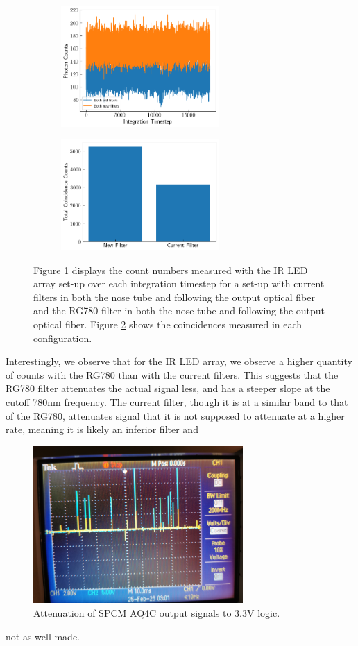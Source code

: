 \documentclass[letterpaper, 11 pt]{article}
\begin{document}
\begin{figure}[H]%
    \centering
    \begin{subfigure}{.4\textwidth}
    \includegraphics[width=6cm]{filter_ch1_IRled.png}
    \caption{ }
    \label{fig:irch1}
    \end{subfigure}
    \begin{subfigure}{.4\textwidth}
    \includegraphics[width = 6cm]{filter_cc_irled.png}
    \caption{ }
    \label{fig:ircc}
    \end{subfigure}
    \caption{Figure \ref{fig:irch1} displays the count numbers measured with the IR LED array set-up over each
    integration timestep for a set-up with current filters in both the
    nose tube and following the output optical fiber and the RG780 filter in
    both the nose tube and following the output optical fiber. Figure
    \ref{fig:ircc} shows the coincidences measured in each configuration.}
    \label{fig:ir_comp}
\end{figure}

Interestingly, we observe that for the IR LED array, we observe a higher quantity of counts
with the RG780 than with the current filters. This suggests that the RG780 filter attenuates
the actual signal less, and has a steeper slope at the cutoff 780nm frequency. The current filter,
though it is at a similar band to that of the RG780, attenuates signal that it is not supposed to attenuate
at a higher rate, meaning it is likely an inferior filter and \begin{figure}[H]
    \centering
    \includegraphics[width = 8cm]{BB_attenuate.jpg}
    \caption{Attenuation of SPCM AQ4C output signals to 3.3V logic.}
    \label{fig:signals}
\end{figure}not as well made.
\end{document}
